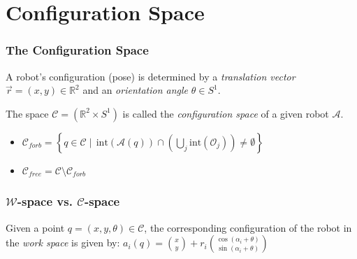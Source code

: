 \documentclass[ucs,9pt,pagenumbers]{beamer}
\begin{document}
\section{Configuration Space}
\begin{frame}
  \frametitle{The Configuration Space}
  A robot's configuration (pose) is determined by a \emph{translation vector} \(\vec{r}=(x,y) \in \mathbb{R}^2\) and an \emph{orientation angle} \(\theta\in S^1\).

  \begin{definition}
    The space \(\mathcal{C} = \left( \mathbb{R}^2 \times S^1 \right)\) is called the \emph{configuration space} of a given robot \(\mathcal{A}\).

    \begin{itemize}
    \item \(\mathcal{C}_{forb} = \left\{ q \in \mathcal{C} \mid \,
        \mathrm{int}(\mathcal{A}(q)) \cap \left(\bigcup_{j} \mathrm{int}(\mathcal{O}_j)\right) \neq
        \emptyset \right\} \)
    \item \(\mathcal{C}_{free}  = \mathcal{C} \setminus \mathcal{C}_{forb}\)
    \end{itemize}
  \end{definition}
\end{frame}

\begin{frame}
  \frametitle{\(\mathcal{W}\)-space vs. \(\mathcal{C}\)-space}
  Given a point \(q=\left(x,y,\theta\right)\in \mathcal{C}\), the
  corresponding configuration of the robot in the \emph{work space} is given by: %
  \(
  a_i(q) = \binom{x}{y}+r_i \binom{\cos(\alpha_i + \theta)}{\sin(\alpha_i+\theta)}
  \)

  \begin{figure}
    \centering
    
  \end{figure}
\end{frame}
\end{document}
